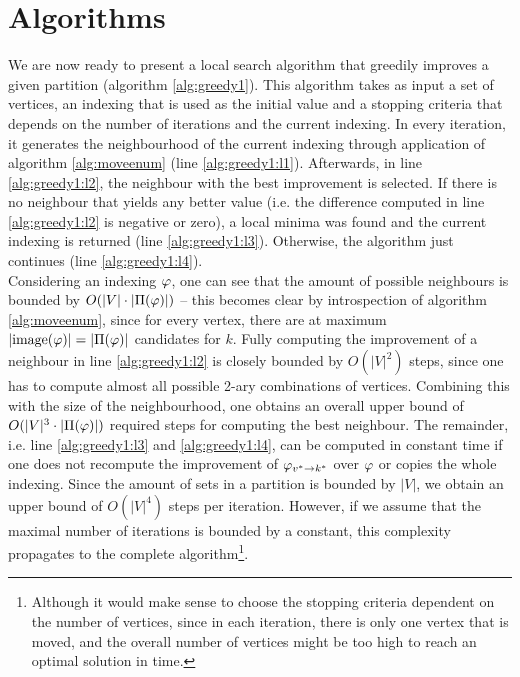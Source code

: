 

\section{Algorithms} \label{sec:algorithms}

We are now ready to present a local search algorithm that greedily improves a given partition (algorithm \ref{alg:greedy1}). This algorithm takes as input a set of vertices, an indexing that is used as the initial value and a stopping criteria that depends on the number of iterations and the current indexing. In every iteration, it generates the neighbourhood of the current indexing through application of algorithm \ref{alg:moveenum} (line \ref{alg:greedy1:l1}). Afterwards, in line \ref{alg:greedy1:l2}, the neighbour with the best improvement is selected. If there is no neighbour that yields any better value (i.e. the difference computed in line \ref{alg:greedy1:l2} is negative or zero), a local minima was found and the current indexing is returned (line \ref{alg:greedy1:l3}). Otherwise, the algorithm just continues (line \ref{alg:greedy1:l4}). \\
Considering an indexing $\varphi$, one can see that the amount of possible neighbours is bounded by $O(|V| \cdot |\Pi(\varphi) |)$ -- this becomes clear by introspection of algorithm \ref{alg:moveenum}, since for every vertex, there are at maximum $|\mathrm{image}(\varphi)| = |\Pi(\varphi)|$ candidates for $k$. Fully computing the improvement of a neighbour in line \ref{alg:greedy1:l2} is closely bounded by $O(|V|^2)$ steps, since one has to compute almost all possible 2-ary combinations of vertices. Combining this with the size of the neighbourhood, one obtains an overall upper bound of $O(|V|^3 \cdot |\Pi(\varphi)|)$ required steps for computing the best neighbour. The remainder, i.e. line \ref{alg:greedy1:l3} and \ref{alg:greedy1:l4}, can be computed in constant time if one does not recompute the improvement of $\varphi_{v^*\rightarrow k^*}$ over $\varphi$ or copies the whole indexing. Since the amount of sets in a partition is bounded by $|V|$, we obtain an upper bound of $O(|V|^4)$ steps per iteration. However, if we assume that the maximal number of iterations is bounded by a constant, this complexity propagates to the complete algorithm\footnote{Although it would make sense to choose the stopping criteria dependent on the number of vertices, since in each iteration, there is only one vertex that is moved, and the overall number of vertices might be too high to reach an optimal solution in time.}.

